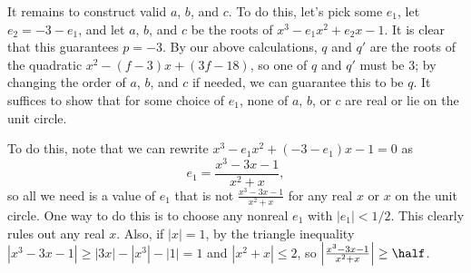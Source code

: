 It remains to construct valid $a$, $b$, and $c$.
To do this, let's pick some $e_1$, let $e_2 = -3 - e_1$,
and let $a$, $b$, and $c$ be the roots of $x^3 - e_1x^2 + e_2 x - 1$.
It is clear that this guarantees $p = -3$.
By our above calculations, $q$ and $q'$ are the roots of the quadratic
$x^2 - (f-3)x + (3f - 18)$, so one of $q$ and $q'$ must be $3$;
by changing the order of $a$, $b$, and $c$ if needed,
we can guarantee this to be $q$.
It suffices to show that for some choice of $e_1$,
none of $a$, $b$, or $c$ are real or lie on the unit circle.

To do this, note that we can rewrite $x^3 - e_1x^2 + (-3-e_1) x - 1 = 0$ as
\[ e_1 = \frac{x^3 - 3x - 1}{x^2 + x}, \]
so all we need is a value of $e_1$ that is not
$\frac{x^3 - 3x - 1}{x^2 + x}$ for any real $x$ or $x$ on the unit circle.
One way to do this is to choose any nonreal $e_1$ with $|e_1| < 1/2$.
This clearly rules out any real $x$.
Also, if $|x| = 1$, by the triangle inequality
$|x^3 - 3x - 1| \geq |3x| - |x^3| - |1| = 1$
and $|x^2 + x| \leq 2$, so $\left\lvert \frac{x^3-3x-1}{x^2+x} \right\rvert \geq \half$.

